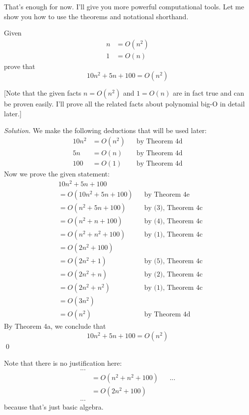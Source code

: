 That's enough for now.
I'll give you more powerful computational tools.
Let me show you how to use the theorems and notational shorthand.

\newpage

\begin{eg}
Given
\begin{align*}
n       &= O(n^2)  \tag{1}\\
1       &= O(n)    \tag{2}
\end{align*}
prove that
\[
10n^2 + 5n + 100 = O(n^2)
\]
\end{eg}

[Note that the given facts
$n = O(n^2)$ and 
$1 = O(n)$
are in fact true and can be proven easily.
I'll prove all the related facts about polynomial big-O in detail later.]

\textit{Solution.}
We make the following deductions that will be used later:
\begin{align*}
10n^2 &= O(n^2) & & \text{by Theorem 4d} \tag{3} \\
5n    &= O(n)   & & \text{by Theorem 4d} \tag{4} \\
100   &= O(1)   & & \text{by Theorem 4d} \tag{5}
\end{align*}
Now we prove the given statement:
\begin{align*}
&10n^2 + 5n + 100 \\
&= O(10n^2 + 5n + 100) & & \text{by Theorem 4e} \\
&= O(n^2 + 5n + 100)   & & \text{by (3), Theorem 4c} \\
&= O(n^2 + n + 100)    & & \text{by (4), Theorem 4c} \\
&= O(n^2 + n^2 + 100)  & & \text{by (1), Theorem 4c} \\
&= O(2n^2 + 100)       \\
&= O(2n^2 + 1)         & & \text{by (5), Theorem 4c}\\
&= O(2n^2 + n)         & & \text{by (2), Theorem 4c}\\
&= O(2n^2 + n^2)       & & \text{by (1), Theorem 4c}\\
&= O(3n^2)             \\
&= O(n^2)              & & \text{by Theorem 4d}
\end{align*}
By Theorem 4a, we conclude that
\[
10n^2 + 5n + 100 = O(n^2)
\]
\qed

Note that there is no justification here:
\begin{align*}
...\\
&= O(n^2 + n^2 + 100)  & & ... \\
&= O(2n^2 + 100)       \\
...
\end{align*}
because that's just basic algebra.

